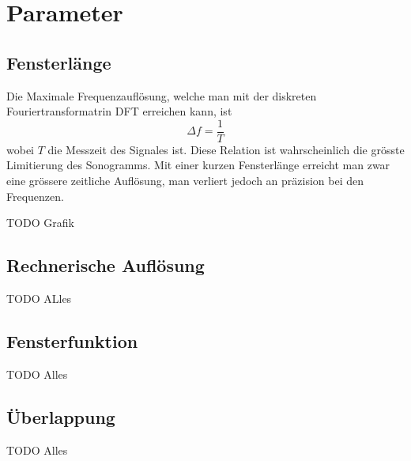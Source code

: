 %
%
%
%
\section{Parameter
\label{sonogramm:section:teil1}}

\subsection{Fensterlänge}
Die Maximale Frequenzauflösung, welche man mit der diskreten Fouriertransformatrin DFT erreichen
kann, ist 
\begin{equation}
    \Delta f = \frac{1}{T}
\end{equation}
wobei $T$ die Messzeit des Signales ist.
Diese Relation ist wahrscheinlich die grösste Limitierung des Sonogramms.
Mit einer kurzen Fensterlänge erreicht man zwar eine grössere zeitliche Auflösung,
man verliert jedoch an präzision bei den Frequenzen.

TODO Grafik


\subsection{Rechnerische Auflösung}
TODO ALles

\subsection{Fensterfunktion}
TODO Alles

\subsection{Überlappung}
TODO Alles


